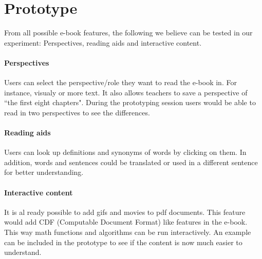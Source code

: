\section{Prototype}
From all possible e-book features, the following we believe can be tested in our experiment: Perspectives, reading aids and interactive content.

\paragraph{Perspectives}

Users can select the perspective/role they want to read the e-book in. For instance, visualy or more text. It also allows teachers to save a perspective of ``the first eight chapters". During the prototyping session users would be able to read in two perspectives to see the differences.

\paragraph{Reading aids}
Users can look up definitions and synonyms of words by clicking on them. In addition, words and sentences could be translated or used in a different sentence for better understanding.

\paragraph{Interactive content}
It is al ready possible to add gifs and movies to pdf documents. This feature would add CDF (Computable Document Format) like features in the e-book. This way math functions and algorithms can be run interactively. An example can be included in the prototype to see if the content is now much easier to understand.
  